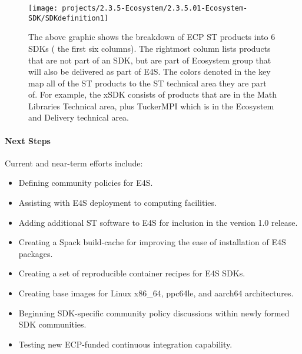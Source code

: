\begin{figure}[htb]
        \centering
        \texttt{[image: projects/2.3.5-Ecosystem/2.3.5.01-Ecosystem-SDK/SDKdefinition1]}
        \caption{\label{fig:sdk-definition1}The above graphic shows the breakdown of ECP ST products into 6 SDKs ( the first six columns).  The rightmost column lists products that are not part of an SDK, but are part of Ecosystem group that will also be delivered as part of E4S. The colors denoted in the key map all of the ST products to the ST technical area they are part of.  For example, the xSDK consists of products that are in the Math Libraries Technical area, plus TuckerMPI which is in the Ecosystem and Delivery technical area.}
\end{figure}

\paragraph{Next Steps}
Current and near-term efforts include:

\begin{itemize}
\item  Defining community policies for E4S.
\item  Assisting with E4S deployment to computing facilities.
\item  Adding additional ST software to E4S for inclusion in the version 1.0 release.
\item  Creating a Spack build-cache for improving the ease of installation of E4S packages. 
\item  Creating a set of reproducible container recipes for E4S SDKs.
\item  Creating base images for Linux x86\_64, ppc64le, and aarch64 architectures.
\item  Beginning SDK-specific community policy discussions within newly formed SDK communities.
\item  Testing new ECP-funded continuous integration capability.
\end{itemize}

